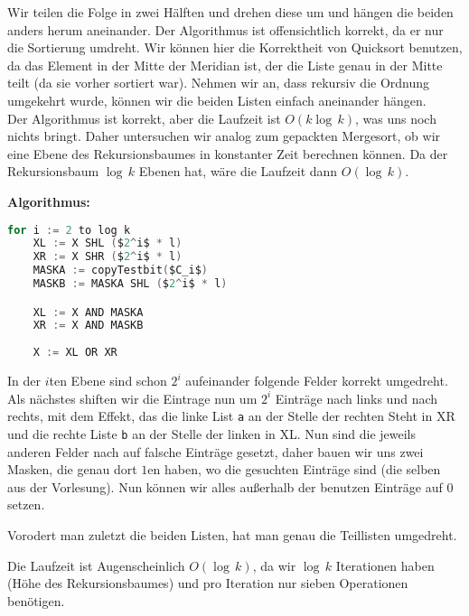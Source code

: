 \documentclass[11pt,a4paper,ngerman]{article}
\begin{document}
Wir teilen die Folge in zwei Hälften und drehen diese um und hängen die beiden anders herum aneinander.
Der Algorithmus ist offensichtlich korrekt, da er nur die Sortierung umdreht. Wir können hier die Korrektheit von Quicksort benutzen,
da das Element in der Mitte der Meridian ist, der die Liste genau in der Mitte teilt (da sie vorher sortiert war). Nehmen wir an, dass
rekursiv die Ordnung umgekehrt wurde, können wir die beiden Listen einfach aneinander hängen.\\

Der Algorithmus ist korrekt, aber die Laufzeit ist $O(k \log \, k)$, was uns noch nichts bringt. Daher untersuchen wir analog zum gepackten Mergesort,
ob wir eine Ebene des Rekursionsbaumes in konstanter Zeit berechnen können. Da der Rekursionsbaum $\log \, k$ Ebenen hat, wäre die Laufzeit dann $O(\log \, k)$.\\

\newpage

\noindent\textbf{Algorithmus:}
\begin{lstlisting}[frame=single,language=C, morekeywords={:=,SHR,SHL,NOT,XOR,AND,OR,MUL}]
for i := 2 to log k
	XL := X SHL ($2^i$ * l)
	XR := X SHR ($2^i$ * l)
	MASKA := copyTestbit($C_i$)
	MASKB := MASKA SHL ($2^i$ * l)

	XL := X AND MASKA
	XR := X AND MASKB
	
	X := XL OR XR
\end{lstlisting}

In der $i$ten Ebene sind schon $2^i$ aufeinander folgende Felder korrekt umgedreht. Als nächstes shiften wir die Eintrage nun um $2^i$ Einträge nach links und nach rechts, mit dem Effekt, das die linke List \lstinline|a| an der Stelle der rechten Steht in XR und die rechte Liste \lstinline|b| an der Stelle der linken in XL. Nun sind die jeweils anderen Felder nach auf falsche Einträge gesetzt, daher bauen wir uns zwei Masken, die genau dort
$1$en haben, wo die gesuchten Einträge sind (die selben aus der Vorlesung). Nun können wir alles außerhalb der benutzen Einträge auf $0$ setzen.

Vorodert man zuletzt die beiden Listen, hat man genau die Teillisten umgedreht.

Die Laufzeit ist Augenscheinlich $O(\log \, k)$, da wir $\log \, k$ Iterationen haben (Höhe des Rekursionsbaumes) und pro Iteration nur sieben Operationen benötigen.

\label{LastPage}
\end{document}
